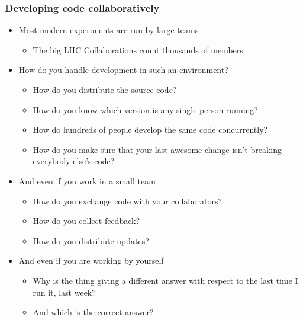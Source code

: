 \documentclass[9pt]{beamer}
\begin{document}
\begin{frame}
  \frametitle{Developing code collaboratively}
  \begin{itemize}
  \item Most modern experiments are run by large teams
    \begin{itemize}
    \item The big LHC Collaborations count thousands of members
    \end{itemize}
  \item How do you handle development in such an environment?
    \begin{itemize}
    \item How do you distribute the source code?
    \item How do you know which version is any single person running?
    \item How do hundreds of people develop the same code concurrently?
    \item How do you make sure that your last awesome change isn't breaking
      everybody else's code?
    \end{itemize}
  \item And even if you work in a small team
    \begin{itemize}
    \item How do you exchange code with your collaborators?
    \item How do you collect feedback?
    \item How do you distribute updates?
    \end{itemize}
  \item And even if you are working by yourself
    \begin{itemize}
    \item Why is the thing giving a different answer with respect to the last
      time I run it, last week?
    \item And which is the correct answer?
    \end{itemize}
  \end{itemize}
\end{frame}
\end{document}
